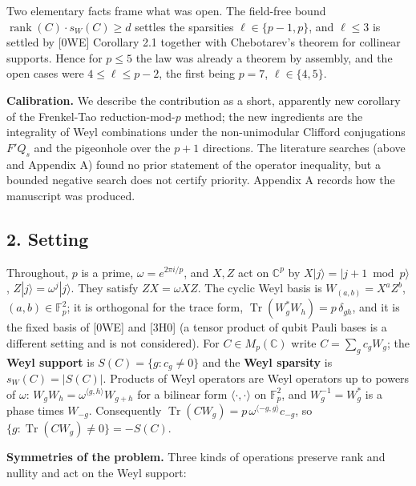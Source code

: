 \documentclass[
  11pt,
  a4paper,
]{article}
\begin{document}
Two elementary facts frame what was open. The field-free bound
\(\operatorname{rank}(C)\cdot s_W(C)\ge d\) settles the sparsities
\(\ell\in\{p-1,\allowbreak{}p\}\), and \(\ell\le3\) is settled by {[}0WE{]} Corollary
2.1 together with Chebotarev's theorem for collinear supports. Hence for
\(p\le5\) the law was already a theorem by assembly, and the open cases
were \(4\le\ell\le p-2\), the first being \(p=7\), \(\ell\in\{4,\allowbreak{}5\}\).

\textbf{Calibration.} We describe the contribution as a short,
apparently new corollary of the Frenkel-Tao reduction-mod-\(p\) method;
the new ingredients are the integrality of Weyl combinations under the
non-unimodular Clifford conjugations \(F'Q_s\) and the pigeonhole over
the \(p+1\) directions. The literature searches (above and Appendix A)
found no prior statement of the operator inequality, but a bounded
negative search does not certify priority. Appendix A records how the
manuscript was produced.

\subsection{2. Setting}\label{setting}

Throughout, \(p\) is a prime, \(\omega=e^{2\pi i/p}\), and \(X,\allowbreak{}Z\) act
on \(\mathbb C^p\) by \(X|j\rangle=|j+1\bmod p\rangle\),
\(Z|j\rangle=\omega^j|j\rangle\). They satisfy \(ZX=\omega XZ\). The
cyclic Weyl basis is \(W_{(a,\allowbreak{}b)}=X^aZ^b\), \((a,\allowbreak{}b)\in\mathbb F_p^2\); it
is orthogonal for the trace form,
\(\operatorname{Tr}(W_g^*W_h)=p\,\allowbreak{}\delta_{gh}\), and it is the fixed
basis of {[}0WE{]} and {[}3H0{]} (a tensor product of qubit Pauli bases
is a different setting and is not considered). For
\(C\in M_p(\mathbb C)\) write \(C=\sum_gc_gW_g\); the \textbf{Weyl
support} is \(S(C)=\{g:c_g\ne0\}\) and the \textbf{Weyl sparsity} is
\(s_W(C)=|S(C)|\). Products of Weyl operators are Weyl operators up to
powers of \(\omega\): \(W_gW_h=\omega^{\langle g,\allowbreak{}h\rangle}W_{g+h}\) for
a bilinear form \(\langle\cdot,\allowbreak{}\cdot\rangle\) on \(\mathbb F_p^2\), and
\(W_g^{-1}=W_g^*\) is a phase times \(W_{-g}\). Consequently
\(\operatorname{Tr}(CW_g)=p\,\allowbreak{}\omega^{\langle-g,\allowbreak{}g\rangle}c_{-g}\), so
\(\{g:\operatorname{Tr}(CW_g)\ne0\}=-S(C)\).

\textbf{Symmetries of the problem.} Three kinds of operations preserve
rank and nullity and act on the Weyl support:
\end{document}
